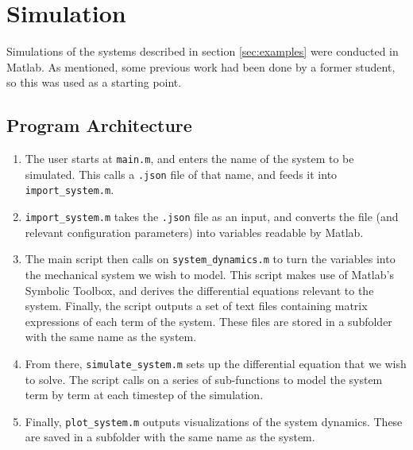 \documentclass[main.tex]{subfiles}
\begin{document}
\section{Simulation}
Simulations of the systems described in section \ref{sec:examples} were conducted in Matlab. As mentioned, some previous work had been done by a former student, so this was used as a starting point.
\subsection{Program Architecture}
\begin{enumerate}
    \item The user starts at \verb|main.m|, and enters the name of the system to be simulated. This calls a \verb|.json| file of that name, and feeds it into \verb|import_system.m|.
    \item \verb|import_system.m| takes the \verb|.json| file as an input, and converts the file (and relevant configuration parameters) into variables readable by Matlab.
    \item The main script then calls on \verb|system_dynamics.m| to turn the variables into the mechanical system we wish to model. This script makes use of Matlab's Symbolic Toolbox, and derives the differential equations relevant to the system. Finally, the script outputs a set of text files containing matrix expressions of each term of the system. These files are stored in a subfolder with the same name as the system.
    \item From there, \verb|simulate_system.m| sets up the differential equation that we wish to solve. The script calls on a series of sub-functions to model the system term by term at each timestep of the simulation. 
    \item Finally, \verb|plot_system.m| outputs visualizations of the system dynamics. These are saved in a subfolder with the same name as the system.
\end{enumerate}
\end{document}
